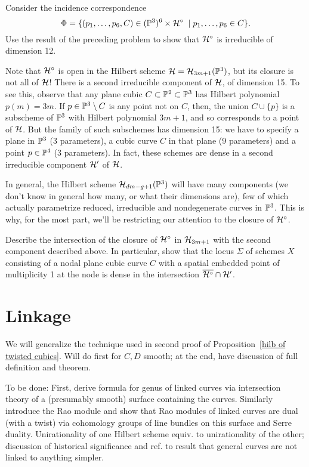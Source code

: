 \begin{exercise}
Consider the incidence correspondence
$$
\Phi = \{ (p_1,\dots,p_6, C) \in ({\mathbb P}^3)^6 \times {\cal H}^\circ \; \mid p_1,\dots,p_6 \in C  \}.
$$
Use the result of the preceding problem to show that ${\cal H}^\circ$ is irreducible of dimension 12.
\end{exercise}


Note that ${\cal H}^\circ$ is open in the Hilbert scheme ${\cal H} = {\cal H}_{3m+1}({\mathbb P}^3)$, but its closure is not all of ${\cal H}$! There is a second irreducible component of ${\cal H}$, of dimension 15. To see this, observe that any plane cubic $C \subset {\mathbb P}^2 \subset {\mathbb P}^3$ has Hilbert polynomial $p(m) = 3m$. If $p \in {\mathbb P}^3 \setminus C$ is any point not on $C$, then, the union $C \cup \{p\}$ is a subscheme of ${\mathbb P}^3$ with Hilbert polynomial $3m+1$, and so corresponds to a point of ${\cal H}$. But the family of such subschemes has dimension 15: we have to specify a plane in ${\mathbb P}^3$ (3 parameters), a cubic curve $C$ in that plane (9 parameters) and a point $p \in {\mathbb P}^4$ (3 parameters). In fact, these schemes are dense in a second irreducible component ${\cal H}'$ of ${\cal H}$.

In general, the Hilbert scheme ${\cal H}_{dm-g+1}({\mathbb P}^3)$ will have many components (we don't know in general how many, or what their dimensions are), few of which actually parametrize reduced, irreducible and nondegenerate curves in ${\mathbb P}^3$. This is why, for the most part, we'll be restricting our attention to the closure of ${\cal H}^\circ$. 

\begin{exercise}
Describe the intersection of the closure  of ${\cal H}^\circ$ in ${\cal H}_{3m+1}$ with the second component described above. In particular, show that the locus $\Sigma$ of schemes $X$ consisting of a nodal plane cubic curve $C$ with a spatial embedded point of multiplicity 1 at the node is dense in the intersection $\overline{{\cal H}^\circ} \cap {\cal H}'$.
\end{exercise}

\section{Linkage} 

We will generalize the technique used in second proof of Proposition~\ref{hilb of twisted cubics}. Will do first for $C, D$ smooth; at the end, have discussion of full definition and theorem.

To be done: First, derive formula for genus of linked curves via intersection theory of a (presumably smooth) surface containing the curves. Similarly introduce the Rao module and show that Rao modules of linked curves are dual (with a twist) via cohomology groups of line bundles on this surface and Serre duality. Unirationality of one Hilbert scheme equiv. to unirationality of the other; discussion of historical significance and ref. to result that general curves are not linked to anything simpler.

